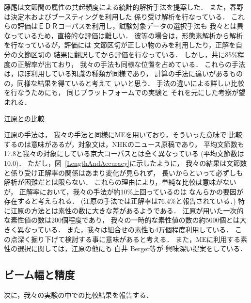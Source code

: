 藤尾\cite{fujio:emnlp98}は文節間の属性の共起頻度による統計的解析手法を提案した．
また，春野\cite{haruno:nlpsympo97}は決定木およびブースティングを利用した
係り受け解析を行なっている．
これらの評価はＥＤＲコーパスを利用し，試験対象データの選択手法も
我々とは異なっているため，直接的な評価は難しい．
彼等の場合は，形態素解析から解析を行なっているが，評価には
文節区切が正しい物のみを利用したり，正解を自分の文節区切の
結果に翻訳してから評価を行なっている．
しかし，共に85\%程度の正解率が出ており，
我々の手法も同様な位置を占めている．
これらの手法は，ほぼ利用している知識の種類が同様であり，
計算の手法に違いがあるものの，同様な結果を得ていると考えて
いいと思う．
手法の違いによる詳しい比較を行なうためにも，
同じプラットフォームでの実験と
それを元にした考察が望まれる．

\begin{flushleft}
\underline{江原との比較}
\end{flushleft}

江原の手法\cite{ehara:nlp98}は，
我々の手法と同様にMEを用いており，そういった意味で
比較するのは意味があるが，対象文は，NHKのニュース原稿であり，
平均文節数も17.8と我々の対象にしている京大コーパスとは全く異なっている
(平均文節数は10.0)．
ただし，図~\ref{LengthAndAccuracy}に示したように，
我々の結果は文節数と係り受け正解率の関係はあまり変化が見られず，
長いからといって必ずしも解析が困難だとは限らない．
これらの理由により，単純な比較は意味がないが，
正解率において，我々の手法が約10\%上回っているのは
なんらかの要因が存在すると考えられる．
(江原の手法では正解率は76.4\%と報告されている．)
特に江原の方法とは素性の数に大きな差があるようである．
江原が用いた一次的な素性値の数は200個程度であり，
我々の一時的な素性値の数の約5000個とは大きく異なっている．
また，我々は組合せの素性も4万個程度利用している．
この点深く掘り下げて検討する事に意味があると考える．
また，MEに利用する素性の選択に関しては，江原の他にも
白井\cite{shirai:jnlp98:2} Berger\cite{berger:emnlp98}等が
興味深い提案をしている．

\subsection{ビーム幅と精度}

次に，我々の実験の中での比較結果を報告する．

